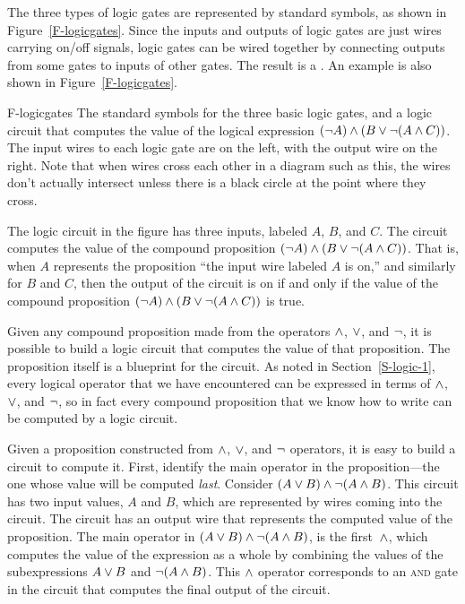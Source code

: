 The three types of logic gates are represented by standard symbols,
as shown in Figure~\ref{F-logicgates}.  Since the inputs and outputs
of logic gates are just wires carrying on/off signals, logic gates
can be wired together by connecting outputs from some gates to
inputs of other gates.  The result is a .
An example is also shown in Figure~\ref{F-logicgates}.

\fig
   {F-logicgates}
   {The standard symbols for the three basic logic gates, and a
    logic circuit that computes the value of the logical
    expression $(\lnot A)\wedge(B\vee\lnot(A\wedge C))$.  The input wires to
    each logic gate are on the left, with the output wire on the
    right.  Note that when wires cross each other in a diagram
    such as this, the wires don't actually intersect unless
    there is a black circle at the point where they cross.}
   {  }
   

The logic circuit in the figure has three inputs, labeled
$A$, $B$, and $C$.  The circuit computes the value of the
compound proposition $(\lnot A)\wedge(B\vee\lnot(A\wedge C))$.
That is, when $A$ represents the proposition ``the input wire
labeled $A$ is on,'' and similarly for $B$ and $C$, then
the output of the circuit is on if and only if the
value of the compound proposition $(\lnot A)\wedge(B\vee\lnot(A\wedge C))$
is true.

Given any compound proposition made from the operators
$\wedge$, $\vee$, and $\lnot$, it is possible to build a logic
circuit
that computes the value of that proposition.  The
proposition itself is a blueprint for the circuit.  As noted
in Section~\ref{S-logic-1}, every logical operator that we have 
encountered can be expressed in terms of $\wedge$, $\vee$, and $\lnot$,
so in fact every compound proposition that we know how to write
can be computed by a logic circuit. 

Given a proposition constructed
from $\wedge$, $\vee$, and $\lnot$ operators, it is
easy to build a circuit to compute it.  First, identify the main
operator in the proposition---the one whose value will be
computed \emph{last}.  Consider $(A\vee B)\wedge\lnot(A\wedge B)$.
This circuit has two input values, $A$ and $B$, which are represented
by wires coming into the circuit.  The circuit has an output wire
that represents the computed value of the proposition.
The main operator in $(A\vee B)\wedge\lnot(A\wedge B)$,
is the first~$\wedge$, which computes the
value of the expression as a whole by combining the values
of the subexpressions $A\vee B$ and $\lnot(A\wedge B)$.  This $\wedge$
operator corresponds to an \textsc{and} gate in the circuit that
computes the final output of the circuit.

